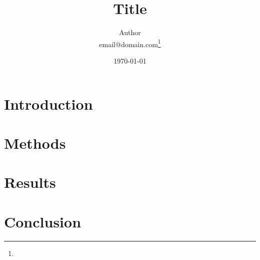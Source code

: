 \documentclass[a4paper,english,british]{scrartcl}
\begin{document}
\ifpdf
\else
\fi

\title{Title}
\author{Author \\
{email@domain.com}\thanks{}}	%
\date{\today}
\maketitle

\begin{abstract}

\end{abstract}

\section{Introduction}

\section{Methods}

\section{Results}

\section{Conclusion}

\end{document}
